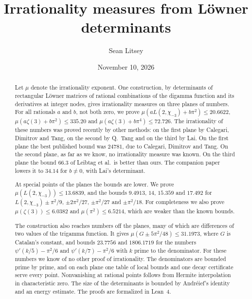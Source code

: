 \documentclass[11pt]{amsart}
\theoremstyle{definition}
\theoremstyle{remark}
\numberwithin{equation}{section}
\newcommand{\MuLamU}{31.1973}
\newcommand{\MuThirdsU}{9.4913}
\newcommand{\MuFifthsU}{23.7756}
\newcommand{\MuSeventhsU}{1806.1719}
\newcommand{\MuChi}{13.6839}
\newcommand{\MuHalvesU}{6.5214}
\newcommand{\MuPlaneA}{20.6622}
\newcommand{\MuPlaneB}{335.20}
\newcommand{\MuPlaneC}{72.726}
\newcommand{\MuZetaThree}{6.0382}
\newcommand{\MuDipA}{14}
\newcommand{\MuDipB}{15.359}
\newcommand{\MuDipC}{17.492}
\begin{document}
\title[Irrationality measures from L\"owner determinants]{Irrationality measures from L\"owner determinants}

\author{Sean Litsey}

\date{November 10, 2026}



\begin{abstract}
Let $\mu$ denote the irrationality exponent. One construction, by determinants of rectangular L\"owner matrices of
rational combinations of the digamma function and its derivatives at integer nodes, gives irrationality measures on
three planes of numbers. For all rationals $a$ and $b$, not both zero, we prove
$\mu(aL(2,\chi_{-3})+b\pi^2)\le\MuPlaneA$, $\mu(a\zeta(3)+b\pi^2)\le\MuPlaneB$ and
$\mu(a\zeta(3)+b\pi^4)\le\MuPlaneC$. The irrationality of these numbers was proved recently by other methods: on the
first plane by Calegari, Dimitrov and Tang, on the second by Q.~Tang and on the third by Lai. On the first plane the
best published bound was $24781$, due to Calegari, Dimitrov and Tang. On the second plane, as far as we know, no
irrationality measure was known. On the third plane the bound $66.3$ of Leibtag et al.\ is better than ours. The
companion paper \cite{Litsey2026d} lowers it to $34.14$ for $b\ne0$, with Lai's determinant.

At special points of the planes the bounds are lower. We prove $\mu(L(2,\chi_{-3}))\le\MuChi$, and the bounds
$\MuThirdsU$, $\MuDipA$, $\MuDipB$ and $\MuDipC$ for $L(2,\chi_{-3})\pm\pi^2/9$, $\pm2\pi^2/27$, $\pm\pi^2/27$ and
$\pm\pi^2/18$. For completeness we also prove $\mu(\zeta(3))\le\MuZetaThree$ and $\mu(\pi^2)\le\MuHalvesU$,
which are weaker than the known bounds.

The construction also reaches numbers off the planes, many of which are differences of two values of the trigamma
function. It gives $\mu(G\pm5\pi^2/48)\le\MuLamU$, where $G$ is Catalan's constant, and bounds $\MuFifthsU$ and
$\MuSeventhsU$ for the numbers $\psi'(k/5)-\pi^2/6$ and $\psi'(k/7)-\pi^2/6$ with $k$ prime to the denominator. For
these numbers we know of no other proof of irrationality. The denominators are bounded prime by prime, and on each plane one table of local
bounds and one decay certificate serve every point. Nonvanishing at rational points follows from Hermite
interpolation in characteristic zero. The size of the determinants is bounded by Andr\'eief's identity and an energy
estimate. The proofs are formalized in Lean~4.
\end{abstract}
\end{document}
